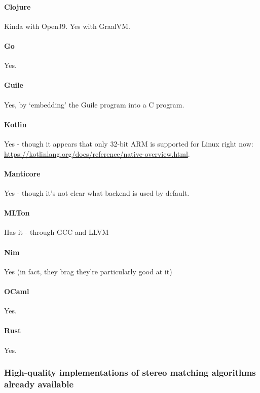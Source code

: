 \paragraph{Clojure}
Kinda with OpenJ9.  Yes with GraalVM.

\paragraph{Go}
Yes.

\paragraph{Guile}
Yes, by `embedding' the Guile program into a C program.

\paragraph{Kotlin}
Yes - though it appears that only 32-bit ARM is supported for Linux right now: \url{https://kotlinlang.org/docs/reference/native-overview.html}.

\paragraph{Manticore}
Yes - though it's not clear what backend is used by default.

\paragraph{MLTon}
Has it - through GCC and LLVM

\paragraph{Nim}
Yes (in fact, they brag they're particularly good at it)

\paragraph{OCaml}
Yes.

\paragraph{Rust}
Yes.

\subsubsection{High-quality implementations of stereo matching algorithms already available}

